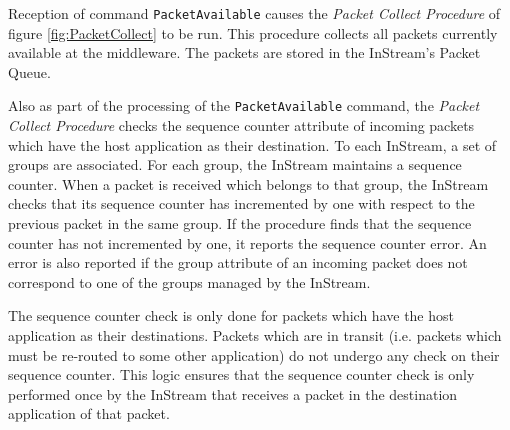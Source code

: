 Reception of command \texttt{PacketAvailable} causes the \textit{Packet Collect Procedure} of figure \ref{fig:PacketCollect} to be run. This procedure collects all packets currently available at the middleware. The packets are stored in the InStream's Packet Queue. 

Also as part of the processing of the \texttt{PacketAvailable} command, the \textit{Packet Collect Procedure} checks the sequence counter attribute of incoming packets which have the host application as their destination. To each InStream, a set of groups are associated. For each group, the InStream maintains a sequence counter. When a packet is received which belongs to that group, the InStream checks that its sequence counter has incremented by one with respect to the previous packet in the same group. If the procedure finds that the sequence counter has not incremented by one, it reports the sequence counter error. An error is also reported if the group attribute of an incoming packet does not correspond to one of the groups managed by the InStream.

The sequence counter check is only done for packets which have the host application as their destinations. Packets which are in transit (i.e. packets which must be re-routed to some other application) do not undergo any check on their sequence counter. This logic ensures that the sequence counter check is only performed once by the InStream that receives a packet in the destination application of that packet. 
